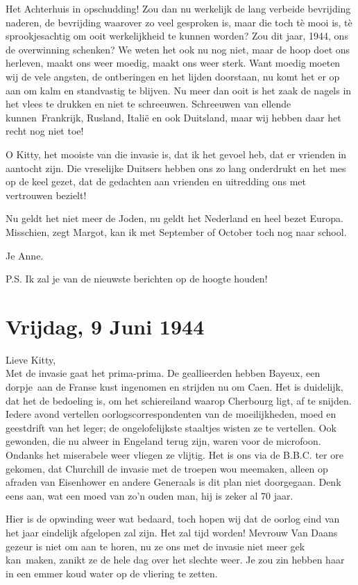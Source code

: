 \documentclass{book}
\begin{document}
Het Achterhuis in opschudding! Zou dan nu werkelijk de lang verbeide
bevrijding naderen, de bevrijding waarover zo veel gesproken is, maar
die toch tè mooi is, tè sprookjesachtig om ooit werkelijkheid te kunnen
worden? Zou dit jaar, 1944, ons de overwinning schenken? We weten het
ook nu nog niet, maar de hoop doet ons herleven, maakt ons weer moedig,
maakt ons weer sterk. Want moedig moeten wij de vele angsten, de
ontberingen en het lijden doorstaan, nu komt het er op aan om kalm en
standvastig te blijven. Nu meer dan ooit is het zaak de nagels in het
vlees te drukken en niet te schreeuwen. Schreeuwen van ellende
kunnen~Frankrijk, Rusland, Italië en ook Duitsland, maar wij hebben daar
het recht nog niet toe!

O Kitty, het mooiste van die invasie is, dat ik het gevoel heb, dat er
vrienden in aantocht zijn. Die vreselijke Duitsers hebben ons zo lang
onderdrukt en het mes op de keel gezet, dat de gedachten aan vrienden en
uitredding ons met vertrouwen bezielt!

Nu geldt het niet meer de Joden, nu geldt het Nederland en heel bezet
Europa. Misschien, zegt Margot, kan ik met September of October toch nog
naar school.

Je Anne.

P.S. Ik zal je van de nieuwste berichten op de hoogte houden!

\chapter{Vrijdag, 9 Juni 1944}

Lieve Kitty,\\Met de invasie gaat het prima-prima. De geallieerden
hebben Bayeux, een dorpje~aan de Franse kust ingenomen en strijden nu om
Caen. Het is duidelijk, dat het de bedoeling is, om het schiereiland
waarop Cherbourg ligt, af te snijden. Iedere avond vertellen
oorlogscorrespondenten van de moeilijkheden, moed en geestdrift van het
leger; de ongelofelijkste staaltjes wisten ze te vertellen. Ook
gewonden, die nu alweer in Engeland terug zijn, waren voor de microfoon.
Ondanks het miserabele weer vliegen ze vlijtig. Het is ons via de B.B.C.
ter ore gekomen, dat Churchill de invasie met de troepen wou meemaken,
alleen op afraden van Eisenhower en andere Generaals is dit plan niet
doorgegaan. Denk eens aan, wat een moed van zo'n ouden man, hij is zeker
al 70 jaar.

Hier is de opwinding weer wat bedaard, toch hopen wij dat de oorlog eind
van het jaar eindelijk afgelopen zal zijn. Het zal tijd worden! Mevrouw
Van Daans gezeur is niet om aan te horen, nu ze ons met de invasie niet
meer gek kan~maken, zanikt ze de hele dag over het slechte weer. Je zou
zin hebben haar in een emmer koud water op de vliering te zetten.
\end{document}
